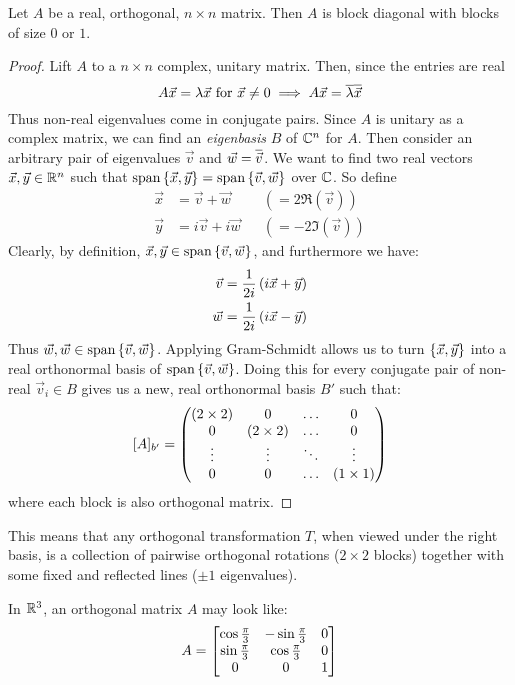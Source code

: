 \begin{theorem}
  Let $A$ be a real, orthogonal, $n \times n$ matrix. Then $A$ is block diagonal with blocks of size $0$ or $1$.
\end{theorem}
\begin{proof}
  Lift $A$ to a $n \times n$ complex, unitary matrix. Then, since the entries are real
    $$A\vec x = \lambda \vec x \text{ for } \vec x \ne 0 \implies A\vec x = \overline{\lambda}\overline{\vec x}$$
  Thus non-real eigenvalues come in conjugate pairs. Since $A$ is unitary as a complex matrix,
  we can find an \emph{eigenbasis} $B$ of $\mathbb{C}^n$ for $A$. Then consider an arbitrary pair of eigenvalues $\vec v$ and $\vec w = \overline{\vec v}$.
  We want to find two real vectors $\vec x, \vec y \in \mathbb{R}^n$ such that $\text{span}\left\{\vec x, \vec y\right\} = \text{span}\left\{\vec v, \vec w\right\}$ over $\mathbb{C}$.
  So define
    \begin{align}
      \vec x &=  \vec v +  \vec w  & &(= 2\Re(\vec v)) \\
      \vec y &= i\vec v + i\vec w  & &(= -2\Im(\vec v))
    \end{align}
  Clearly, by definition, $\vec x, \vec y \in \text{span}\left\{\vec v,\vec w\right\}$, and furthermore we have:
    \begin{align}
      \vec v &= \frac{1}{2i}\left(i\vec x + \vec y\right) \\
      \vec w &= \frac{1}{2i}\left(i\vec x - \vec y\right) \\
    \end{align}
  Thus $\vec w, \vec w \in \text{span}\left\{\vec v,\vec w\right\}$. Applying Gram-Schmidt allows us to turn $\left\{\vec x, \vec y\right\}$
  into a real orthonormal basis of $\text{span}\left\{\vec v, \vec w\right\}$. Doing this for every conjugate pair of non-real $\vec v_i \in B$
  gives us a new, real orthonormal basis $B'$ such that:
  $$[A]_{b'} = \begin{pmatrix}
    (2\times 2) & 0 & \ldots & 0 \\
    0 & (2 \times 2) & \ldots & 0 \\
    \vdots & \vdots & \ddots & \vdots \\
    0 & 0 & \ldots & (1\times 1)
  \end{pmatrix}$$
  where each block is also orthogonal matrix.
\end{proof}
\begin{remark}
  This means that any orthogonal transformation $T$, when viewed under the right basis,
  is a collection of pairwise orthogonal rotations ($2 \times 2$ blocks) together with some fixed and reflected lines ($\pm1$ eigenvalues).
\end{remark}
\begin{thmexample}
  In $\mathbb{R}^3$, an orthogonal matrix $A$ may look like:
  $$A = \begin{bmatrix}
    \cos \frac{\pi}3 & -\sin \frac{\pi}3 & 0 \\
    \sin \frac{\pi}3 &  \cos \frac{\pi}3 & 0 \\
    0                &  0                & 1
  \end{bmatrix}$$
\end{thmexample}

